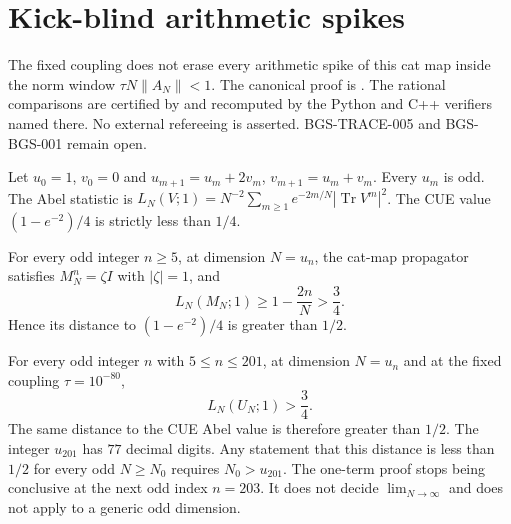 \section{Kick-blind arithmetic spikes}
\label{sec:kick-blind-arithmetic-spike}
The fixed coupling does not erase every arithmetic spike of this cat map
inside the norm window $\tau N\|A_N\|<1$. The canonical proof is
.
The rational comparisons are certified by
 and recomputed by the
Python and C++ verifiers named there. No external refereeing is asserted.
BGS-TRACE-005 and BGS-BGS-001 remain open.

Let $u_0=1$, $v_0=0$ and $u_{m+1}=u_m+2v_m$, $v_{m+1}=u_m+v_m$.
Every $u_m$ is odd. The Abel statistic is
$L_N(V;1)=N^{-2}\sum_{m\ge1}e^{-2m/N}|\operatorname{Tr}V^m|^2$.
The CUE value $(1-e^{-2})/4$ is strictly less than $1/4$.

\begin{theorem}
\label{thm:pure-cat-abel-spike}
For every odd integer $n\ge5$, at dimension $N=u_n$, the cat-map propagator
satisfies $M_N^n=\zeta I$ with $|\zeta|=1$, and
\[
 L_N(M_N;1)\ge1-\frac{2n}{N}>\frac34.
\]
Hence its distance to $(1-e^{-2})/4$ is greater than $1/2$.
\end{theorem}

\begin{theorem}
\label{thm:kick-blind-window}
For every odd integer $n$ with $5\le n\le201$, at dimension $N=u_n$ and at
the fixed coupling $\tau=10^{-80}$,
\[
 L_N(U_N;1)>\frac34.
\]
The same distance to the CUE Abel value is therefore greater than $1/2$.
The integer $u_{201}$ has $77$ decimal digits. Any statement that this
distance is less than $1/2$ for every odd $N\ge N_0$ requires $N_0>u_{201}$.
The one-term proof stops being conclusive at the next odd index $n=203$.
It does not decide $\lim_{N\to\infty}$ and does not apply to a generic odd
dimension.
\end{theorem}
